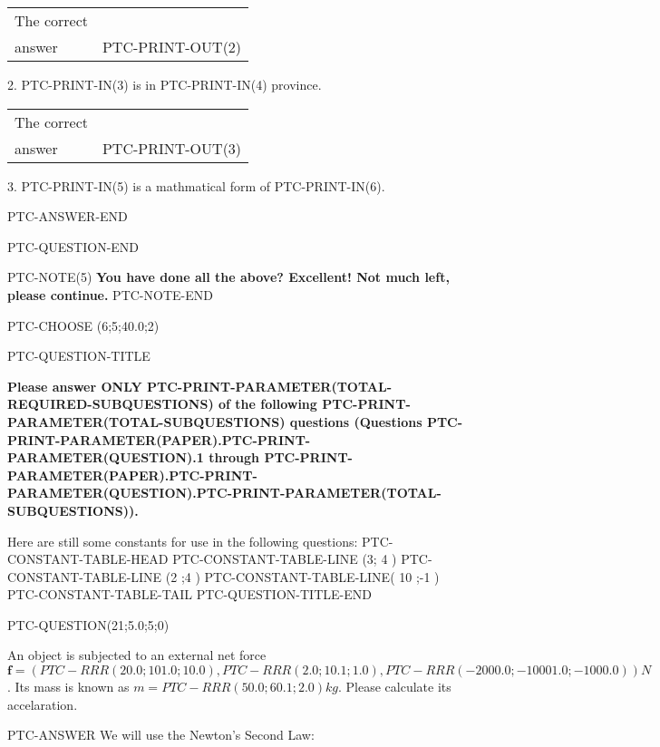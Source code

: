 \documentclass[12pt]{article}
\begin{document}
\noindent\begin{tabular}{|l|l|}\hline The correct & \\
          answer & PTC-PRINT-OUT(2) \\ \hline \end{tabular}
2. PTC-PRINT-IN(3) is in PTC-PRINT-IN(4) province.

\noindent\begin{tabular}{|l|l|}\hline The correct & \\
          answer & PTC-PRINT-OUT(3) \\ \hline \end{tabular}
3. PTC-PRINT-IN(5) is a mathmatical form of PTC-PRINT-IN(6).

PTC-ANSWER-END

\vspace{0.3in}
PTC-QUESTION-END



PTC-NOTE(5)
\vspace{0.3in}
{\textbf{\LARGE{You have done all the above? Excellent! Not much left, please continue.}}}
\vspace{0.3in}
PTC-NOTE-END



\vspace{0.3in}




PTC-CHOOSE (6;5;40.0;2)

PTC-QUESTION-TITLE

{\textbf{\Large{Please answer ONLY
PTC-PRINT-PARAMETER(TOTAL-REQUIRED-SUBQUESTIONS) of the following
PTC-PRINT-PARAMETER(TOTAL-SUBQUESTIONS) questions (Questions
PTC-PRINT-PARAMETER(PAPER).PTC-PRINT-PARAMETER(QUESTION).1 through
PTC-PRINT-PARAMETER(PAPER).PTC-PRINT-PARAMETER(QUESTION).PTC-PRINT-PARAMETER(TOTAL-SUBQUESTIONS)). }}}

Here are still some constants for use in the following questions:
PTC-CONSTANT-TABLE-HEAD
PTC-CONSTANT-TABLE-LINE (3; 4                  )
PTC-CONSTANT-TABLE-LINE (2 ;4                 )
PTC-CONSTANT-TABLE-LINE( 10 ;-1              )
PTC-CONSTANT-TABLE-TAIL
PTC-QUESTION-TITLE-END


PTC-QUESTION(21;5.0;5;0)

An object is subjected to an external net force $\mathbf{f}=(
PTC-RRR (20.0; 101.0; 10.0), PTC-RRR( 2.0; 10.1; 1.0),
PTC-RRR (-2000.0; -10001.0; -1000.0)  )N$. Its mass is known as
$m=PTC-RRR ( 50.0; 60.1; 2.0 ) kg$. Please calculate its accelaration.


PTC-ANSWER
We will use the Newton's Second Law:
\end{document}
